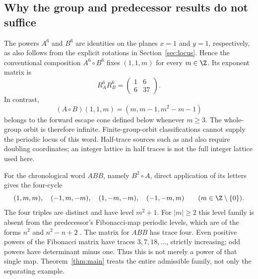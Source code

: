\subsection{Why the group and predecessor results do not suffice}\label{sec:separators}

The powers $A^6$ and $B^6$ are identities on the planes $x=1$
and $y=1$, respectively, as also follows from the explicit
rotations in Section~\ref{sec:locus}. Hence the conventional
composition $A^6\circ B^6$ fixes $(1,1,m)$ for every $m\in\Z$.
Its exponent matrix is
\[
 R_A^6R_B^6=\begin{pmatrix}1&6\\6&37\end{pmatrix}.
\]
In contrast,
\begin{equation}\label{eq:groupseparator}
 (A\circ B)(1,1,m)=(m,m-1,m^2-m-1)
\end{equation}
belongs to the forward escape cone defined below whenever $m\ge3$.
The whole-group orbit is therefore infinite. Finite-group-orbit
classifications cannot supply the periodic locus of this word.
Half-trace sources such as \citet{RobertsBaake1994} and
\citet{Humphries2016} also require doubling coordinates; an
integer lattice in half traces is not the full integer lattice
used here.

For the chronological word $ABB$, namely $B^2\circ A$, direct
application of its letters gives the four-cycle
\begin{equation}\label{eq:ABB}
 (1,m,m),\quad(-1,m,-m),\quad(1,-m,-m),\quad(-1,-m,m)
 \qquad(m\in\Z\setminus\{0\}).
\end{equation}
The four triples are distinct and have level $m^2+1$.
For $|m|\ge2$ this level family is absent from the predecessor's
Fibonacci-map periodic levels, which are of the forms $n^2$ and
$n^2-n+2$ \citep{C413}. The matrix for $ABB$ has trace four.
Even positive powers of the Fibonacci matrix have traces
$3,7,18,\ldots$, strictly increasing; odd powers have determinant
minus one. Thus this is not merely a power of that single map.
Theorem~\ref{thm:main} treats the entire admissible family, not
only the separating example.
